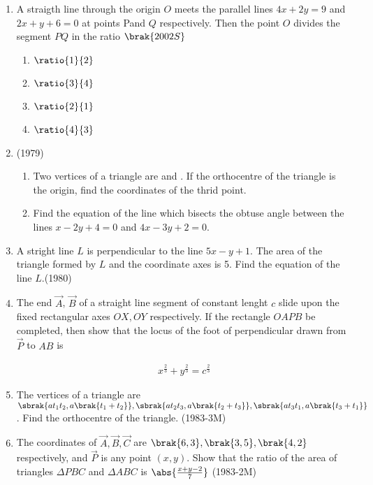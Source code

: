 \begin{enumerate}
\begin{enumerate}
\end{enumerate}
\item A straigth line through the origin $O$ meets the parallel lines $4x+2y=9$ and $2x+y+6=0$ at points Pand $Q$ respectively. Then the point $O$ divides the segment $PQ$ in the ratio 
\hfill{$\brak{2002S}$}
\begin{enumerate}

     \item $\ratio{1}{2}$
     \item $\ratio{3}{4}$
     \item $\ratio{2}{1}$
     \item $\ratio{4}{3}$

\end{enumerate}
\item                    	\hfill{(1979)}
	\begin{enumerate}
             \item  Two vertices of a triangle are  and . If the orthocentre of the triangle is the origin, find the coordinates of the thrid point.
	     \item  Find the equation of the line which bisects the obtuse angle between  the lines $x-2y+4=0$ and $4x-3y+2=0$.
         \end{enumerate}

\item A stright line $L$ is perpendicular to the line $5x-y+1$. The area of the triangle formed by $L$ and the coordinate axes is 5. Find the equation of the line $L$.\hfill{(1980)}

\item The end $\vec{A}$, $\vec{B}$ of a straight line segment of constant lenght $c$ slide upon the fixed rectangular axes $ OX, OY$ respectively. If the rectangle $OAPB$ be completed, then show that the locus of the foot of perpendicular drawn from $\vec{P}$ to $AB$ is 

 \begin{align*}  x^\frac{2}{3} + y^\frac{2}{3} = c^\frac{2}{3} \end{align*}

  \item The vertices of a triangle are $\sbrak{ at_1t_2,a\brak{t_1+t_2}}, \sbrak{ at_2t_3,a\brak{t_2+t_3}},\sbrak{at_3t_1,a\brak{t_3+t_1}}$. Find the orthocentre of the triangle. \hfill{(1983-3M)}
	  
  \item The coordinates of $\vec{A},\vec{B},\vec{C}$ are $ \brak{6,3}, \brak{3,5}, \brak{4,2} $ respectively, and $\vec{P}$ is any point $(x,y)$.
Show that the ratio of the area of triangles $\Delta PBC$  and $\Delta ABC$ is $\abs{\frac{x+y-2}{7}}$ \hfill{(1983-2M)} 


\end{enumerate}
